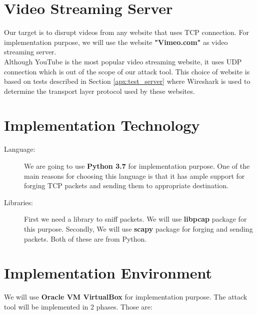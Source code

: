 \documentclass[14pt]{extarticle}
\begin{document}
\section{Video Streaming Server}
    Our target is to disrupt videos from any website that uses TCP connection. For implementation purpose, we will use the website \textbf{"Vimeo.com"} as video streaming server. \\
    Although YouTube is the most popular video streaming website, it uses UDP connection which is out of the scope of our attack tool. This choice of website is based on tests described in Section \ref{apx:test_server} where Wireshark is used to determine the transport layer protocol used by these websites.    

\section{Implementation Technology}
    \begin{description}
    
    \item[Language:] We are going to use \textbf{Python 3.7} for implementation purpose. One of the main reasons for choosing this language is that it has ample support for forging TCP packets and sending them to appropriate destination. 
    
    \item[Libraries:] First we need a library to sniff packets. We will use \textbf{libpcap} package for this purpose. Secondly, We will use \textbf{scapy} package for forging and sending packets. Both of these are from Python.
    
    \end{description}



\section{Implementation Environment}
    
    We will use \textbf{Oracle VM VirtualBox}  for implementation purpose. The attack tool will be implemented in 2 phases. Those are: 
    
\end{document}
